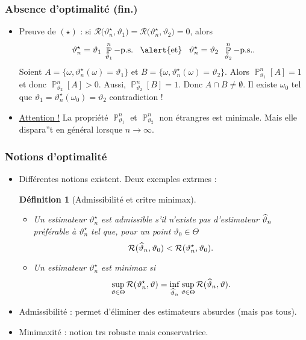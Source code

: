 \documentclass{beamer}
\newtheorem{df}{Définition}
\DeclareMathOperator{\PP}{{\mathbb P}}
\DeclareMathOperator{\est}{\widehat \vartheta_{\mathnormal{n}}}
\begin{document}
\begin{frame}
\frametitle{Absence d'optimalité (fin.)}
\begin{itemize}
\item Preuve de $(\star)$ : si ${\mathcal R}\big(\vartheta_n^\star,\vartheta_1\big) = {\mathcal R}\big(\vartheta_n^\star,\vartheta_2\big)=0$, alors
$$\vartheta_n^\star=\vartheta_1\;\PP_{\vartheta_1}^n-\text{p.s.}\;\;\;\text{\alert{et}}\;\;\;\vartheta_n^\star=\vartheta_2\;\;\PP_{\vartheta_2}^n-\text{p.s.}.$$
Soient $A=\{\omega, \vartheta_n^\star(\omega)=\vartheta_1\}$ et $B=\{\omega, \vartheta_n^\star(\omega)=\vartheta_2\}$. Alors $\PP_{\vartheta_1}^n[A]=1$ et donc $\PP_{\vartheta_2}^n[A]>0$. Aussi, $\PP_{\vartheta_2}^n[B]=1$. Donc $A \cap B \neq \emptyset$.
Il existe $\omega_0$ tel que $\vartheta_1 = \vartheta_n^\star(\omega_0) = \vartheta_2$ \alert{contradiction !}
\item \underline{Attention !} La propriété $\PP^n_{\vartheta_1}$ et $\PP^n_{\vartheta_2}$ non étrangres est \alert{minimale}. Mais elle dispara”t en général lorsque $n\rightarrow \infty$.
\end{itemize}
\end{frame}

\begin{frame}
\frametitle{Notions d'optimalité}
\begin{itemize}
\item \alert{Différentes notions existent}. Deux exemples extrmes :
\begin{df}[Admissibilité et critre minimax]
\begin{itemize}
\item Un estimateur $\vartheta_n^\star$ est \alert{admissible} s'il \alert{n'existe pas} d'estimateur $\est$ \alert{préférable} à $\vartheta_n^\star$ tel que,
pour \alert{un point} $\vartheta_0 \in \Theta$
$${\mathcal R}(\est,\vartheta_0) < {\mathcal R}(\vartheta_n^\star,\vartheta_0).$$
\item Un estimateur $\vartheta_n^\star$ est \alert{minimax}
si
$$\sup_{\vartheta \in \Theta}{\mathcal R}(\vartheta_n^\star,\vartheta) = \inf_{\est}\sup_{\vartheta \in \Theta}{\mathcal R}(\est,\vartheta).$$
\end{itemize}
\end{df}
\item \alert{Admissibilité} : permet d'éliminer des estimateurs absurdes (mais pas tous).
\item \alert{Minimaxité} : notion trs \alert{robuste mais conservatrice}.
\end{itemize}
\end{frame}
\end{document}
